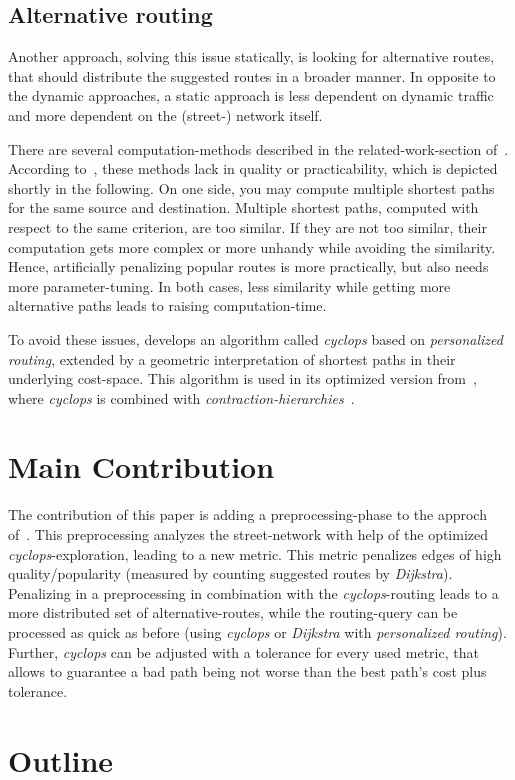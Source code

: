     \subsection{Alternative routing}

        Another approach, solving this issue statically, is looking for alternative routes, that should distribute the suggested routes in a broader manner.
        In opposite to the dynamic approaches, a static approach is less dependent on dynamic traffic and more dependent on the (street-) network itself.

        There are several computation-methods described in the related-work-section of~\cite{barth:alternative_routes}.
        According to~, these methods lack in quality or practicability, which is depicted shortly in the following.
        On one side, you may compute multiple shortest paths for the same source and destination.
        Multiple shortest paths, computed with respect to the same criterion, are too similar.
        If they are not too similar, their computation gets more complex or more unhandy while avoiding the similarity.
        Hence, artificially  penalizing popular routes is more practically, but also needs more parameter-tuning.
        In both cases, less similarity while getting more alternative paths leads to raising computation-time.

        To avoid these issues, \cite{barth:alternative_routes} develops an algorithm called \textit{cyclops} based on \textit{personalized routing}, extended by a geometric interpretation of shortest paths in their underlying cost-space.
        This algorithm is used in its optimized version from~\cite{barth:alternative_multicriteria_routes}, where \textit{cyclops} is combined with \textit{contraction-hierarchies}~\cite{geisberger:contraction_hierarchies}.

\section{Main Contribution}

    The contribution of this paper is adding a preprocessing-phase to the approch of~\cite{barth:alternative_multicriteria_routes}.
    This preprocessing analyzes the street-network with help of the optimized \textit{cyclops}-exploration, leading to a new metric.
    This metric penalizes edges of high quality/popularity (measured by counting suggested routes by \textit{Dijkstra}).
    Penalizing in a preprocessing in combination with the \textit{cyclops}-routing leads to a more distributed set of alternative-routes, while the routing-query can be processed as quick as before (using \textit{cyclops} or \textit{Dijkstra} with \textit{personalized routing}).
    Further, \textit{cyclops} can be adjusted with a tolerance for every used metric, that allows to guarantee a bad path being not worse than the best path's cost plus tolerance.

\section{Outline}

